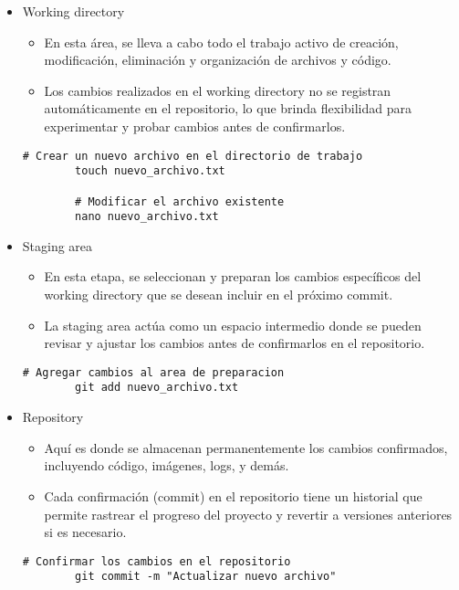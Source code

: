 \begin{itemize}
    \item Working directory
    \begin{itemize}
        \item En esta área, se lleva a cabo todo el trabajo activo de creación, modificación, eliminación y organización de archivos y código.
        \item Los cambios realizados en el working directory no se registran automáticamente en el repositorio, lo que brinda flexibilidad para experimentar y probar cambios antes de confirmarlos.
    \end{itemize}
    \begin{lstlisting}[style=bashstyle]
        # Crear un nuevo archivo en el directorio de trabajo
        touch nuevo_archivo.txt
        
        # Modificar el archivo existente
        nano nuevo_archivo.txt
    \end{lstlisting}

    \item Staging area
    \begin{itemize}
        \item En esta etapa, se seleccionan y preparan los cambios específicos del working directory que se desean incluir en el próximo commit.
        \item La staging area actúa como un espacio intermedio donde se pueden revisar y ajustar los cambios antes de confirmarlos en el repositorio.
    \end{itemize}
    \begin{lstlisting}[style=bashstyle]        
        # Agregar cambios al area de preparacion
        git add nuevo_archivo.txt        
    \end{lstlisting}


    \item Repository
    \begin{itemize}
        \item Aquí es donde se almacenan permanentemente los cambios confirmados, incluyendo código, imágenes, logs, y demás.
        \item Cada confirmación (commit) en el repositorio tiene un historial que permite rastrear el progreso del proyecto y revertir a versiones anteriores si es necesario.
    \end{itemize}
    \begin{lstlisting}[style=bashstyle]        
        # Confirmar los cambios en el repositorio
        git commit -m "Actualizar nuevo archivo"
    \end{lstlisting}
\end{itemize}

